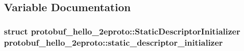 \subsection{Variable Documentation}
\subsubsection[{\texorpdfstring{static\+\_\+descriptor\+\_\+initializer}{static_descriptor_initializer}}]{\setlength{\rightskip}{0pt plus 5cm}struct {\bf protobuf\+\_\+hello\+\_\+2eproto\+::\+Static\+Descriptor\+Initializer}  protobuf\+\_\+hello\+\_\+2eproto\+::static\+\_\+descriptor\+\_\+initializer}\hypertarget{namespaceprotobuf__hello__2eproto_ac38fa2048bc2c0b789234c37ea845a41}{}\label{namespaceprotobuf__hello__2eproto_ac38fa2048bc2c0b789234c37ea845a41}
